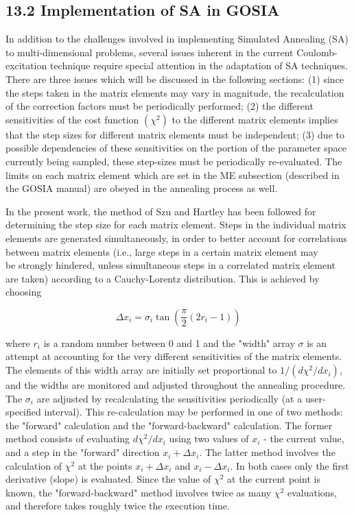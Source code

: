 \documentclass[10pt]{article}
\begin{document}
\subsection*{13.2 Implementation of SA in GOSIA}
In addition to the challenges involved in implementing Simulated Annealing (SA) to multi-dimensional problems, several issues inherent in the current Coulomb-excitation technique require special attention in the adaptation of SA techniques. There are three issues which will be discussed in the following sections: (1) since the steps taken in the matrix elements may vary in magnitude, the recalculation of the correction factors must be periodically performed; (2) the different sensitivities of the cost function $\left(\chi^{2}\right)$ to the different matrix elements implies that the step sizes for different matrix elements must be independent; (3) due to possible dependencies of these sensitivities on the portion of the parameter space currently being sampled, these step-sizes must be periodically re-evaluated. The limits on each matrix element which are set in the ME subsection (described in the GOSIA manual) are obeyed in the annealing process as well.

In the present work, the method of Szu and Hartley has been followed for determining the step size for each matrix element. Steps in the individual matrix elements are generated simultaneously, in order to better account for correlations between matrix elements (i.e., large steps in a certain matrix element may\\
be strongly hindered, unless simultaneous steps in a correlated matrix element are taken) according to a Cauchy-Lorentz distribution. This is achieved by choosing


\begin{equation*}
\Delta x_{i}=\sigma_{i} \tan \left(\frac{\pi}{2}\left(2 r_{i}-1\right)\right) \tag{13.3}
\end{equation*}


where $r_{i}$ is a random number between 0 and 1 and the "width" array $\sigma$ is an attempt at accounting for the very different sensitivities of the matrix elements. The elements of this width array are initially set proportional to $1 /\left(d \chi^{2} / d x_{i}\right)$, and the widths are monitored and adjusted throughout the annealing procedure. The $\sigma_{i}$ are adjusted by recalculating the sensitivities periodically (at a user-specified interval). This re-calculation may be performed in one of two methods: the "forward" calculation and the "forward-backward" calculation. The former method consists of evaluating $d \chi^{2} / d x_{i}$ using two values of $x_{i}$ - the current value, and a step in the "forward" direction $x_{i}+\Delta x_{i}$. The latter method involves the calculation of $\chi^{2}$ at the points $x_{i}+\Delta x_{i}$ and $x_{i}-\Delta x_{i}$. In both cases only the first derivative (slope) is evaluated. Since the value of $\chi^{2}$ at the current point is known, the "forward-backward" method involves twice as many $\chi^{2}$ evaluations, and therefore takes roughly twice the execution time.
\end{document}

